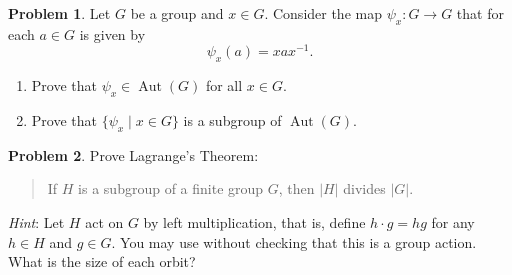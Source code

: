 \documentclass[11pt]{article}
\DeclareMathOperator{\Aut}{Aut}
\theoremstyle{definition}
\newtheorem{problem}{Problem}
\begin{document}
\begin{problem}
Let $G$ be a group and $x\in G$. Consider the map $\psi_x\!:G\to G$ that for each $a \in G$ is given by 
$$\psi_x(a)=xax^{-1}.$$
\begin{enumerate}[label=5.\arabic*.]
\item Prove that $\psi_x\in \Aut(G)$ for all $x\in G$. 

\item Prove that $\{\psi_x\mid x\in G\}$ is a subgroup of $\operatorname{Aut}(G)$.

\end{enumerate}
\end{problem}






\begin{problem}
Prove Lagrange's Theorem: 
\begin{quote}
If $H$ is a subgroup of a finite group $G$, then $|H|$ divides $|G|$. 
\end{quote}

\noindent
{\em Hint}: Let $H$ act on $G$ by left multiplication, that is, define $h \cdot g= hg$ for any $h\in H$ and $g\in G$. You may use without checking that this is a group action. What is the size of each orbit?
\end{problem}
\end{document}
